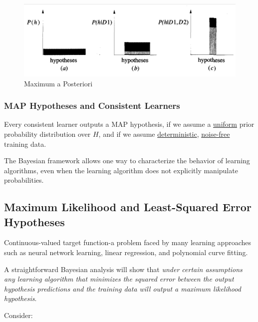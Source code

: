 \begin{figure}[H]
  \centering
  \includegraphics[width=1\textwidth]{./2023May/MAP.png}
  \caption{Maximum a Posteriori}
  \label{MAP}
\end{figure}

\hypertarget{map-hypotheses-and-consistent-learners}{%
\subsubsection{MAP Hypotheses and Consistent
Learners}\label{map-hypotheses-and-consistent-learners}}

Every consistent learner outputs a MAP hypothesis, if we assume a
\underline{uniform} prior probability distribution over \(H\), and if we assume
\underline{deterministic}, \underline{noise-free} training data.

The Bayesian framework allows one way to characterize the behavior of
learning algorithms, even when the learning algorithm does not
explicitly manipulate probabilities.

\hypertarget{maximum-likelihood-and-least-squared-error-hypotheses}{%
\subsection{Maximum Likelihood and Least-Squared Error
Hypotheses}\label{maximum-likelihood-and-least-squared-error-hypotheses}}

Continuous-valued target function-a problem faced by many learning
approaches such as neural network learning, linear regression, and
polynomial curve fitting.

A straightforward Bayesian analysis will show that \emph{under certain
assumptions any learning algorithm that minimizes the squared error
between the output hypothesis predictions and the training data will
output a maximum likelihood hypothesis}.

Consider:

